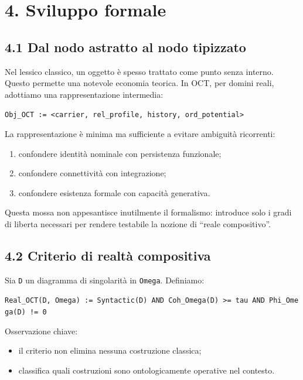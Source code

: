 \section{4. Sviluppo formale}

\subsection{4.1 Dal nodo astratto al nodo tipizzato}

Nel lessico classico, un oggetto è spesso trattato come punto senza interno. Questo permette una notevole economia teorica. In OCT, per domini reali, adottiamo una rappresentazione intermedia:

\texttt{Obj\_OCT\ :=\ \textless{}carrier,\ rel\_profile,\ history,\ ord\_potential\textgreater{}}

La rappresentazione è minima ma sufficiente a evitare ambiguità ricorrenti:

\begin{enumerate}
\def\labelenumi{\arabic{enumi}.}
\tightlist
\item
  confondere identità nominale con persistenza funzionale;
\item
  confondere connettività con integrazione;
\item
  confondere esistenza formale con capacità generativa.
\end{enumerate}

Questa mossa non appesantisce inutilmente il formalismo: introduce solo i gradi di liberta necessari per rendere testabile la nozione di ``reale compositivo''.

\subsection{4.2 Criterio di realtà compositiva}

Sia \texttt{D} un diagramma di singolarità in \texttt{Omega}. Definiamo:

\texttt{Real\_OCT(D,\ Omega)\ :=\ Syntactic(D)\ AND\ Coh\_Omega(D)\ \textgreater{}=\ tau\ AND\ Phi\_Omega(D)\ !=\ 0}

Osservazione chiave:

\begin{itemize}
\tightlist
\item
  il criterio non elimina nessuna costruzione classica;
\item
  classifica quali costruzioni sono ontologicamente operative nel contesto.
\end{itemize}

